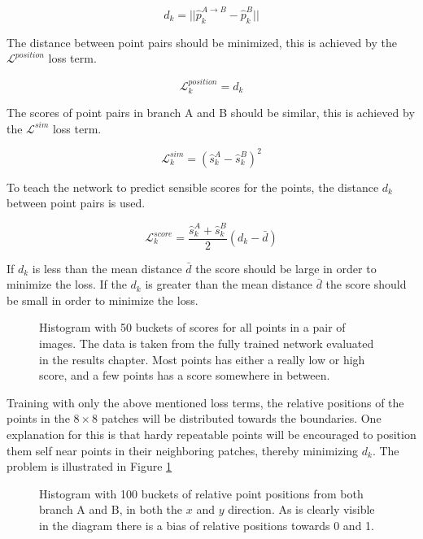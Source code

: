 \[
d_k=||\hat{p}_k^{A\rightarrow B}-\hat{p}_k^B||
\]

The distance between point pairs should be minimized, this is achieved by the $\mathcal{L}^{position}$ loss term.

\[
\mathcal{L}_k^{position} = d_k
\]

The scores of point pairs in branch A and B should be similar, this is achieved by the $\mathcal{L}^{sim}$ loss term.

\[
\mathcal{L}_k^{sim} = \left(\hat{s}_k^{A}-\hat{s}_k^B\right)^2
\]

To teach the network to predict sensible scores for the points, the distance $d_k$ between point pairs is used.

\[
\mathcal{L}_k^{score}=\frac{\hat{s}_k^A+\hat{s}_k^B}{2}\left(d_k-\bar{d}\right)
\]

If $d_k$ is less than the mean distance $\bar{d}$ the score should be large in order to minimize the loss. If the $d_k$ is greater than the mean distance $\bar{d}$ the score should be small in order to minimize the loss.

\begin{figure}[H]
	\begin{center}
		
	\end{center}
	\caption{Histogram with 50 buckets of scores for all points in a pair of images. The data is taken from the fully trained network evaluated in the results chapter. Most points has either a really low or high score, and a few points has a score somewhere in between.}
\end{figure}

Training with only the above mentioned loss terms, the relative positions of the points in the $8\times 8$ patches will be distributed towards the boundaries. One explanation for this is that hardy repeatable points will be encouraged to position them self near points in their neighboring patches, thereby minimizing $d_k$. The problem is illustrated in Figure \ref{fig:hist-no-unixy}

\begin{figure}[H]
	\begin{center}
		
	\end{center}
	\caption{Histogram with 100 buckets of relative point positions from both branch A and B, in both the $x$ and $y$ direction. As is clearly visible in the diagram there is a bias of relative positions towards 0 and 1.}
	\label{fig:hist-no-unixy}
\end{figure}

